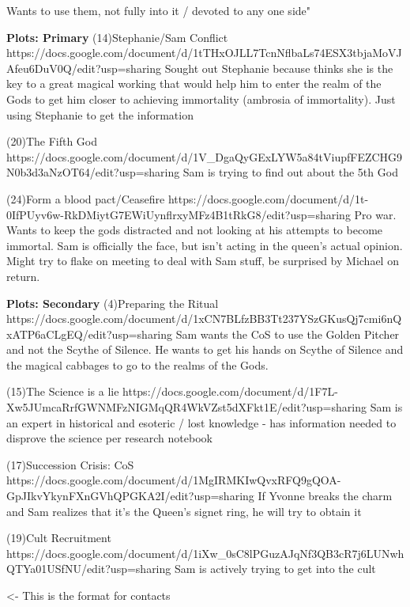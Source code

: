 \documentclass[char]{GL2020}
\begin{document}
Wants to use them, not fully into it / devoted to any one side"

\textbf{Plots: Primary}
(14)Stephanie/Sam Conflict
https://docs.google.com/document/d/1tTHxOJLL7TcnNflbaLs74ESX3tbjaMoVJAfeu6DuV0Q/edit?usp=sharing
Sought out Stephanie because thinks she is the key to a great magical working that would help him to enter the realm of the Gods to get him closer to achieving immortality (ambrosia of immortality).  Just using Stephanie to get the information

(20)The Fifth God
https://docs.google.com/document/d/1V_DgaQyGExLYW5a84tViupfFEZCHG9N0b3d3aNzOT64/edit?usp=sharing
Sam is trying to find out about the 5th God

(24)Form a blood pact/Ceasefire
https://docs.google.com/document/d/1t-0IfPUyv6w-RkDMiytG7EWiUynflrxyMFz4B1tRkG8/edit?usp=sharing
Pro war. Wants to keep the gods distracted and not looking at his attempts to become immortal. Sam is officially the face, but isn’t acting in the queen’s actual opinion. Might try to flake on meeting to deal with Sam stuff, be surprised by Michael on return.


\textbf{Plots: Secondary}
(4)Preparing the Ritual
https://docs.google.com/document/d/1xCN7BLfzBB3Tt237YSzGKusQj7cmi6nQxATP6aCLgEQ/edit?usp=sharing
Sam wants the CoS to use the Golden Pitcher and not the Scythe of Silence.  He wants to get his hands on Scythe of Silence and the magical cabbages to go to the realms of the Gods.

(15)The Science is a lie
https://docs.google.com/document/d/1F7L-Xw5JUmcaRrfGWNMFzNIGMqQR4WkVZst5dXFkt1E/edit?usp=sharing
Sam is an expert in historical and esoteric / lost knowledge - has information needed to disprove the science per research notebook

(17)Succession Crisis: CoS
https://docs.google.com/document/d/1MgIRMKIwQvxRFQ9gQOA-GpJIkvYkynFXnGVhQPGKA2I/edit?usp=sharing
If Yvonne breaks the charm and Sam realizes that it’s the Queen’s signet ring, he will try to obtain it

(19)Cult Recruitment
https://docs.google.com/document/d/1iXw_0sC8lPGuzAJqNf3QB3cR7j6LUNwhQTYa01USfNU/edit?usp=sharing
Sam is actively trying to get into the cult

\begin{itemz}[Goals]
	\item 
\end{itemz}

\begin{itemz}[Notes]
	\item 
\end{itemz}

\begin{contacts}
	\contact{\cTest{}} <- This is the format for contacts 
\end{contacts}
\end{document}
